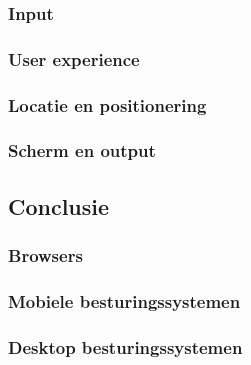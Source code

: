 \subsubsection{Input}
\subsubsection{User experience}
\subsubsection{Locatie en positionering}
\subsubsection{Scherm en output}

\subsection{Conclusie }

\subsubsection{Browsers}

\subsubsection{Mobiele besturingssystemen }

\subsubsection{Desktop besturingssystemen}